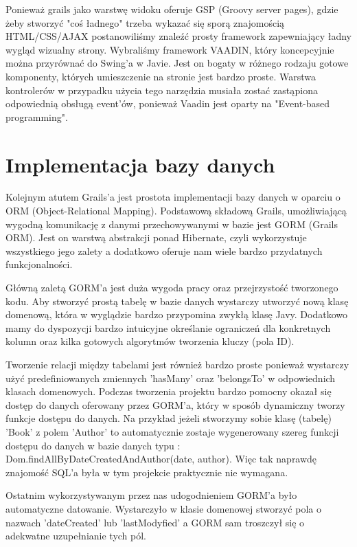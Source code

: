 Ponieważ grails jako warstwę widoku oferuje GSP (Groovy server pages), gdzie żeby stworzyć "coś ładnego" trzeba wykazać się sporą znajomością HTML/CSS/AJAX postanowiliśmy znaleźć prosty framework zapewniający ładny wygląd wizualny strony. Wybraliśmy framework VAADIN, który koncepcyjnie można przyrównać do Swing'a w Javie. Jest on bogaty w różnego rodzaju gotowe komponenty, których umieszczenie na stronie jest bardzo proste. Warstwa kontrolerów w przypadku użycia tego narzędzia musiała zostać zastąpiona odpowiednią obsługą event'ów, ponieważ Vaadin jest oparty na "Event-based programming". 



\section{Implementacja bazy danych}
\label{sec:impldb}

Kolejnym atutem Grails'a jest prostota implementacji bazy danych w oparciu o ORM (Object-Relational Mapping). Podstawową składową Grails, umożliwiającą wygodną komunikację z danymi przechowywanymi w bazie jest GORM (Grails ORM). Jest on warstwą abstrakcji ponad Hibernate, czyli wykorzystuje wszystkiego jego zalety  a dodatkowo oferuje nam wiele bardzo przydatnych funkcjonalności. 

Główną zaletą GORM'a jest duża wygoda pracy oraz przejrzystość tworzonego kodu. Aby stworzyć prostą tabelę w bazie danych wystarczy utworzyć nową klasę domenową, która w wyglądzie bardzo przypomina zwykłą klasę Javy. Dodatkowo mamy do dyspozycji bardzo intuicyjne określanie ograniczeń dla konkretnych kolumn oraz kilka gotowych algorytmów tworzenia kluczy (pola ID). 

Tworzenie relacji między tabelami jest również bardzo proste ponieważ wystarczy użyć predefiniowanych zmiennych 'hasMany' oraz 'belongsTo' w odpowiednich klasach domenowych. Podczas tworzenia projektu bardzo pomocny okazał się dostęp do danych oferowany przez GORM'a, który w sposób dynamiczny tworzy funkcje dostępu do danych. Na przykład jeżeli stworzymy sobie klasę (tabelę) 'Book' z polem 'Author' to automatycznie zostaje wygenerowany szereg funkcji dostępu do danych w bazie danych typu : Dom.findAllByDateCreatedAndAuthor(date, author). Więc tak naprawdę znajomość SQL'a była w tym projekcie praktycznie nie wymagana.

Ostatnim wykorzystywanym przez nas udogodnieniem GORM'a było automatyczne datowanie. Wystarczyło w klasie domenowej stworzyć pola o nazwach 'dateCreated' lub 'lastModyfied' a GORM sam troszczył się o adekwatne uzupełnianie tych pól.

